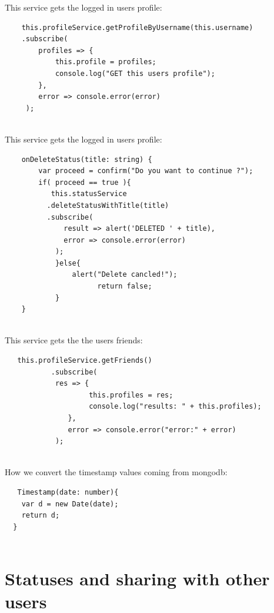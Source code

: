 This service gets the logged in users profile:
\begin{lstlisting}
    this.profileService.getProfileByUsername(this.username)
    .subscribe(
        profiles => {
            this.profile = profiles;
            console.log("GET this users profile");  
        },
        error => console.error(error)
     );
    
\end{lstlisting}

This service gets the logged in users profile:
\begin{lstlisting}
    onDeleteStatus(title: string) {
        var proceed = confirm("Do you want to continue ?");
        if( proceed == true ){
           this.statusService
          .deleteStatusWithTitle(title)
          .subscribe(
              result => alert('DELETED ' + title),
              error => console.error(error)
            );
            }else{
                alert("Delete cancled!");
                      return false;
            }
    }
  
\end{lstlisting}

This service gets the the users friends:
\begin{lstlisting}
   this.profileService.getFriends()
           .subscribe(
            res => {
                    this.profiles = res;
                    console.log("results: " + this.profiles);
               },
               error => console.error("error:" + error)
            );
  
\end{lstlisting}

How we convert the timestamp values coming from mongodb:
\begin{lstlisting}
   Timestamp(date: number){
    var d = new Date(date);
    return d;
  }
  
\end{lstlisting}

\section{Statuses and sharing with other users}

